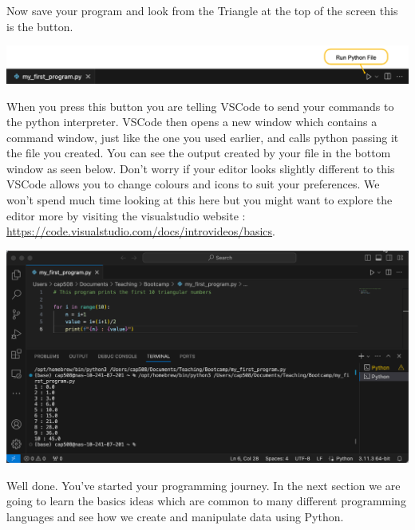 Now save your program and look from the Triangle at the top of the screen this is the  button.

\begin{centering}
    \includegraphics[width=1.0\linewidth]{VSCode-Run.png}
\end{centering}

When you press this button you are telling VSCode to send your commands to the python interpreter. VSCode then opens a new window which contains a command window, just like the one you used earlier, and calls python passing it the file you created. You can see the output created by your file in the bottom window as seen below. Don't worry if your editor looks slightly different to this VSCode allows you to change colours and icons to suit your preferences. We won't spend much time looking at this here but you might want to explore the editor more by visiting the visualstudio website : \url{https://code.visualstudio.com/docs/introvideos/basics}.

\begin{center}
    \includegraphics[width=1.0\linewidth]{images/screenshots/VSCodeEnv.png}
\end{center}

Well done. You've started your programming journey. In the next section we are going to learn the basics ideas which are common to many different programming languages and see how we create and manipulate data using Python.

%

